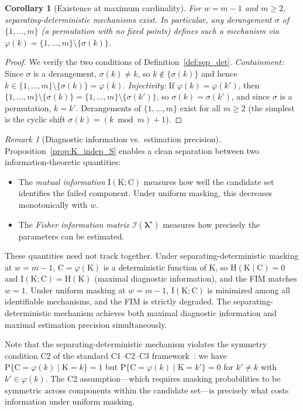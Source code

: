 \documentclass[preprint,12pt]{elsarticle}
\newcommand{\RV}[1]{\mathrm{#1}}
\newcommand{\Prob}[1]{\mathrm{P}\{#1\}}
\newcommand{\cand}{\RV{C}}         %
\newcommand{\tparam}[1]{{#1}^{\star}}  %
\newcommand{\infomatrx}{\mathcal{I}}
\renewcommand{\vec}[1]{\boldsymbol{#1}}
\newtheorem{corollary}[theorem]{Corollary}
\theoremstyle{definition}
\theoremstyle{remark}
\newtheorem{remark}[theorem]{Remark}
\begin{document}
\begin{corollary}[Existence at maximum cardinality]
\label{cor:derangement}
For $w = m-1$ and $m \geq 2$, separating-deterministic mechanisms exist.
In particular, any derangement $\sigma$ of $\{1,\ldots,m\}$ (a permutation with
no fixed points) defines such a mechanism via
$\varphi(k) = \{1,\ldots,m\} \setminus \{\sigma(k)\}$.
\end{corollary}

\begin{proof}
We verify the two conditions of Definition~\ref{def:sep_det}.
\emph{Containment:} Since $\sigma$ is a derangement, $\sigma(k) \neq k$, so
$k \notin \{\sigma(k)\}$ and hence $k \in \{1,\ldots,m\}\setminus\{\sigma(k)\}
= \varphi(k)$.
\emph{Injectivity:} If $\varphi(k) = \varphi(k')$, then
$\{1,\ldots,m\}\setminus\{\sigma(k)\} = \{1,\ldots,m\}\setminus\{\sigma(k')\}$,
so $\sigma(k) = \sigma(k')$, and since $\sigma$ is a permutation, $k = k'$.
Derangements of $\{1,\ldots,m\}$ exist for all $m \geq 2$ (the simplest is the
cyclic shift $\sigma(k) = (k \bmod m) + 1$).
\end{proof}

\begin{remark}[Diagnostic information vs.\ estimation precision]
\label{rem:IKC_vs_FIM}
Proposition~\ref{prop:K_indep_S} enables a clean separation between two
information-theoretic quantities:
\begin{itemize}
\item The \emph{mutual information} $\mathrm{I}(\RV{K}; \cand)$ measures how
  well the candidate set identifies the failed component. Under uniform masking,
  this decreases monotonically with $w$.
\item The \emph{Fisher information matrix} $\infomatrx(\tparam{\vec\lambda})$
  measures how precisely the parameters can be estimated.
\end{itemize}
These quantities need not track together. Under separating-deterministic masking
at $w = m-1$, $\cand = \varphi(\RV{K})$ is a deterministic function of
$\RV{K}$, so $\mathrm{H}(\RV{K} \mid \cand) = 0$ and
$\mathrm{I}(\RV{K}; \cand) = \mathrm{H}(\RV{K})$ (maximal
diagnostic information), and the FIM matches
$w=1$. Under uniform masking at $w = m-1$, $\mathrm{I}(\RV{K};\cand)$ is
minimized among all identifiable mechanisms, and the FIM is strictly degraded.
The separating-deterministic mechanism achieves both maximal diagnostic
information and maximal estimation precision simultaneously.

Note that the separating-deterministic mechanism violates the symmetry condition
C2 of the standard C1--C2--C3 framework~\cite{towell2023reliability}: we have
$\Prob{\cand = \varphi(k) \mid \RV{K} = k} = 1$ but
$\Prob{\cand = \varphi(k) \mid \RV{K} = k'} = 0$ for $k' \neq k$ with
$k' \in \varphi(k)$. The C2 assumption---which requires masking probabilities to
be symmetric across components within the candidate set---is precisely what costs
information under uniform masking.
\end{remark}
\end{document}
